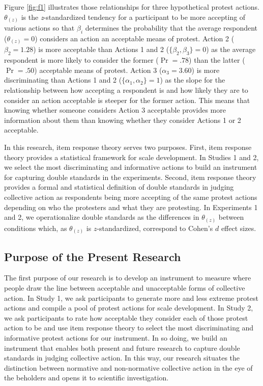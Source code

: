 \documentclass[twocolumn, 11pt, letterpaper]{article}
\begin{document}
Figure \ref{fig:f1} illustrates those relationships for three
hypothetical protest actions. \(\theta_{(z)}\) is the
\emph{z}-standardized tendency for a participant to be more accepting of
various actions so that \(\beta_i\) determines the probability that the
average respondent (\(\theta_{(z)} = 0\)) considers an action an
acceptable means of protest. Action 2 (\(\beta_2 = 1.28\)) is more
acceptable than Actions 1 and 2 (\(\{ \beta_2, \beta_3 \} = 0\)) as the
average respondent is more likely to consider the former (\(\Pr = .78\))
than the latter (\(\Pr = .50\)) acceptable means of protest. Action 3
(\(\alpha_3 = 3.60\)) is more discriminating than Actions 1 and 2
(\(\{ \alpha_1, \alpha_2 \} = 1\)) as the slope for the relationship
between how accepting a respondent is and how likely they are to
consider an action acceptable is steeper for the former action. This
means that knowing whether someone considers Action 3 acceptable
provides more information about them than knowing whether they consider
Actions 1 or 2 acceptable.

In this research, item response theory serves two purposes. First, item
response theory provides a statistical framework for scale development.
In Studies 1 and 2, we select the most discriminating and informative
actions to build an instrument for capturing double standards in the
experiments. Second, item response theory provides a formal and
statistical definition of double standards in judging collective action
as respondents being more accepting of the same protest actions
depending on who the protesters and what they are protesting. In
Experiments 1 and 2, we operationalize double standards as the
differences in \(\theta_{(z)}\) between conditions which, as
\(\theta_{(z)}\) is \(z\)-standardized, correspond to Cohen's \(d\)
effect sizes.

\hypertarget{purpose-of-the-present-research}{%
\subsection{Purpose of the Present
Research}\label{purpose-of-the-present-research}}

The first purpose of our research is to develop an instrument to measure
where people draw the line between acceptable and unacceptable forms of
collective action. In Study 1, we ask participants to generate more and
less extreme protest actions and compile a pool of protest actions for
scale development. In Study 2, we ask participants to rate how
acceptable they consider each of those protest action to be and use item
response theory to select the most discriminating and informative
protest actions for our instrument. In so doing, we build an instrument
that enables both present and future research to capture double
standards in judging collective action. In this way, our research
situates the distinction between normative and non-normative collective
action in the eye of the beholders and opens it to scientific
investigation.
\end{document}
